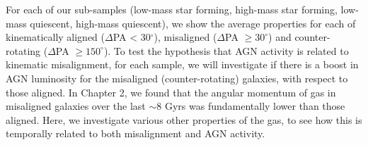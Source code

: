 For each of our sub-samples (low-mass star forming, high-mass star forming, low-mass quiescent, high-mass quiescent), we show the average properties for each of kinematically aligned ($\Delta$PA < 30$^{\circ}$), misaligned ($\Delta$PA $\geq 30^{\circ}$) and counter-rotating ($\Delta$PA $\geq 150^{\circ}$). 
To test the hypothesis that AGN activity is related to kinematic misalignment, for each sample, we will investigate if there is a boost in AGN luminosity for the misaligned (counter-rotating) galaxies, with respect to those aligned. In Chapter 2, we found that the angular momentum of gas in misaligned galaxies over the last $\sim$8 Gyrs was fundamentally lower than those aligned. Here, we investigate various other properties of the gas, to see how this is temporally related to both misalignment and AGN activity.


